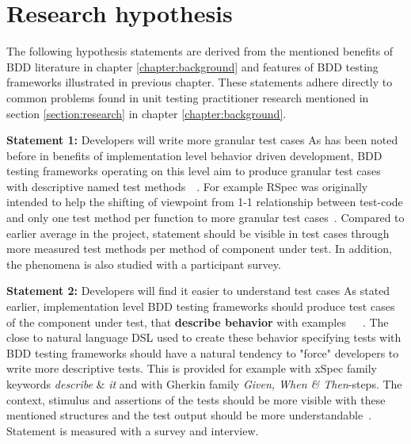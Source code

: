 \section{Research hypothesis} %
    The following hypothesis statements are derived from the mentioned benefits of BDD literature in chapter \ref{chapter:background} and features of BDD
    testing frameworks illustrated in previous chapter. These statements adhere directly to common problems found in unit
    testing practitioner research mentioned in section \ref{section:research} in chapter \ref{chapter:background}.
    \begin{addmargin}[0em]{0em}
    \vspace{10px}
    \textbf{Statement 1:} Developers will write more granular test cases
    \vspace{5px}
    \newline
    As has been noted before in benefits of implementation level behavior driven development, BDD testing frameworks operating on this
    level aim to produce granular test cases with descriptive named test methods~\cite{chelimsky2010rspec}~\cite{astels2006new}.
    For example RSpec was originally intended to help the shifting of viewpoint from 1-1 relationship between test-code
    and only one test method per function to more granular test cases~\cite{astels2006new}.
    Compared to earlier average in the project, statement should be visible in test cases through more measured test methods
    per method of component under test. In addition, the phenomena is also studied with a participant survey.
    \end{addmargin}

    \begin{addmargin}[0em]{0em}
    \vspace{10px}
    \textbf{Statement 2:} Developers will find it easier to understand test cases
    \vspace{5px}
    \newline
    As stated earlier, implementation level BDD testing frameworks should produce test cases of the component under test,
    that \textbf{describe behavior} with examples~\cite{chelimsky2010rspec}~\cite{astels2006new}~\cite{amodeo2015learning}.
    The close to natural language DSL used to create these behavior specifying tests with BDD testing frameworks should
    have a natural tendency to "force" developers to write more descriptive tests. This is provided for example
    with xSpec family keywords \textit{describe} \& \textit{it} and with Gherkin family \textit{Given, When \& Then}-steps.
    The context, stimulus and assertions of the tests should be more visible with these mentioned structures and the test output
    should be more understandable~\cite{smart2014bdd}. Statement is measured with a survey and interview.
    \end{addmargin}

